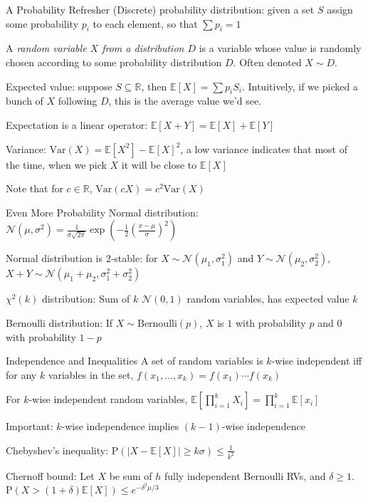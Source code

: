 \begin{frame}{A Probability Refresher}
\protect\hypertarget{a-probability-refresher}{}
(Discrete) probability distribution: given a set \(S\) assign some
probability \(p_i\) to each element, so that \(\sum p_i = 1\)

A \emph{random variable \(X\) from a distribution \(D\)} is a variable
whose value is randomly chosen according to some probability
distribution \(D\). Often denoted \(X \sim D\).

Expected value: suppose \(S \subseteq \mathbb{R}\), then
\(\mathbb{E}[X] = \sum p_i S_i\). Intuitively, if we picked a bunch of
\(X\) following \(D\), this is the average value we'd see.

Expectation is a linear operator:
\(\mathbb{E}[X+Y] = \mathbb{E}[X] + \mathbb{E}[Y]\)

Variance: \(\text{Var}(X) = \mathbb{E}[X^2] - \mathbb{E}[X]^2\), a low
variance indicates that most of the time, when we pick \(X\) it will be
close to \(\mathbb{E}[X]\)

Note that for \(c \in \mathbb{R}\),
\(\text{Var}(cX) = c^2\text{Var}(X)\)
\end{frame}

\begin{frame}{Even More Probability}
\protect\hypertarget{even-more-probability}{}
Normal distribution:
\(\mathcal{N}(\mu, \sigma^2) = \frac{1}{\sigma \sqrt{2\pi}}\exp\left(-\frac{1}{2}\left(\frac{x-\mu}{\sigma}\right)^2\right)\)

Normal distribution is \(2\)-stable: for
\(X \sim \mathcal{N}(\mu_1, \sigma^2_1)\) and
\(Y \sim \mathcal{N}(\mu_2, \sigma^2_2)\),
\(X + Y \sim \mathcal{N}(\mu_1+\mu_2, \sigma^2_1 + \sigma_2^2)\)

\(\chi^2(k)\) distribution: Sum of \(k\) \(\mathcal{N}(0,1)\) random
variables, has expected value \(k\)

Bernoulli distribution: If \(X \sim \text{Bernoulli}(p)\), \(X\) is
\(1\) with probability \(p\) and \(0\) with probability \(1-p\)
\end{frame}

\begin{frame}{Independence and Inequalities}
\protect\hypertarget{independence-and-inequalities}{}
A set of random variables is \(k\)-wise independent iff for any \(k\)
variables in the set, \(f(x_1,\dots,x_k)=f(x_1)\cdots f(x_k)\)

For \(k\)-wise independent random variables,
\(\mathbb{E}\left[\prod_{i=1}^k X_i\right] = \prod_{i=1}^k \mathbb{E}[x_i]\)

Important: \(k\)-wise independence implies \((k-1)\)-wise independence

Chebyshev's inequality:
\(\text{P}(|X - \mathbb{E}[X]| \geq k\sigma) \leq \frac{1}{k^2}\)

Chernoff bound: Let \(X\) be sum of \(h\) fully independent Bernoulli
RVs, and \(\delta \geq 1\).
\(\text{P}(X > (1+\delta)\mathbb{E}[X]) \leq e^{-\delta^2 \mu / 3}\)
\end{frame}

